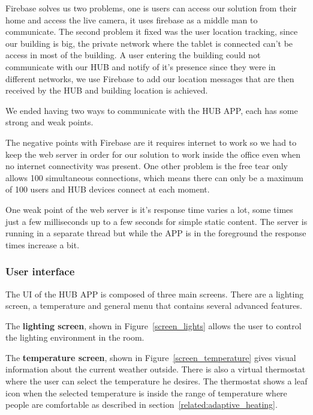 Firebase solves us two problems, one is users can access our solution from their home and access the live camera, it uses firebase as a middle man to communicate. The second problem it fixed was the user location tracking, since our building is big, the private network where the tablet is connected can't be access in most of the building. A user entering the building could not communicate with our HUB and notify of it's presence since they were in different networks, we use Firebase to add our location messages that are then received by the HUB and building location is achieved.

We ended having two ways to communicate with the HUB APP, each has some strong and weak points. 

The negative points with Firebase are it requires internet to work so we had to keep the web server in order for our solution to work inside the office even when no internet connectivity was present. One other problem is the free tear only allows 100 simultaneous connections, which means there can only be a maximum of 100 users and HUB devices connect at each moment.

One weak point of the web server is it's response time varies a lot, some times just a few milliseconds up to a few seconds for simple static content. The server is running in a separate thread but while the APP is in the foreground the response times increase a bit.



\subsubsection{User interface}


The \ac{UI} of the HUB APP is composed of three main screens. There are a lighting screen, a temperature and general menu that contains several advanced features.

The \textbf{lighting screen}, shown in Figure~\ref{screen_lights} allows the user to control the lighting environment in the room.

The \textbf{temperature screen}, shown in Figure~\ref{screen_temperature} gives visual information about the current weather outside. There is also a virtual thermostat where the user can select the temperature he desires. The thermostat shows a leaf icon when the selected temperature is inside the range of temperature where people are comfortable as described in section~\ref{related:adaptive_heating}. 

